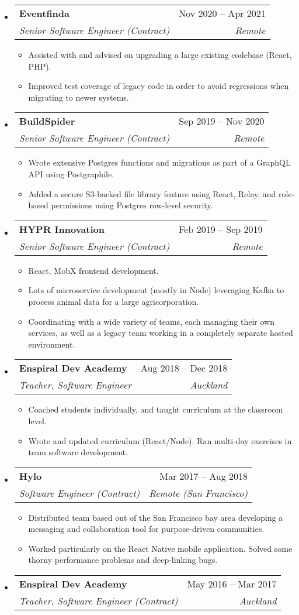 \documentclass[12pt]{article}
\makeatletter
\def \entryspacing {-0em}
\newcommand{\resumeEntryStart}{\begin{itemize}[leftmargin=2.5mm]}
\newcommand{\resumeEntryEnd}{\end{itemize}\vspace{\entryspacing}}
\newcommand{\resumeItemListStart}{\begin{itemize}[leftmargin=4.5mm]}
\newcommand{\resumeItemListEnd}{\end{itemize}}
\newcommand{\resumeItem}[1]{
  \item\small{
    {#1 \vspace{-0.9ex}}
  }
}
\newcommand{\resumeEntryTSDL}[4]{
  \vspace{-0.5ex}\item[]
    \begin{tabularx}{0.97\textwidth}{X@{\hspace{5em}}r}
      \textbf{\color{primary}#1} & {\firabook\color{accent}\small#2} \\
      \textit{\color{accent}\small#3} & \textit{\color{accent}\small#4} \\
    \end{tabularx}\vspace{-0.9ex}
}
\makeatother
\begin{document}
  \resumeEntryStart
    \resumeEntryTSDL
      {Eventfinda}{Nov 2020 -- Apr 2021}
      {Senior Software Engineer (Contract)}{Remote}
    \resumeItemListStart
        \resumeItem {Assisted with and advised on upgrading a large existing codebase (React, PHP).}
        \resumeItem {Improved test coverage of legacy code in order to avoid regressions when migrating to newer systems.}
    \resumeItemListEnd
  \resumeEntryEnd

  \resumeEntryStart
    \resumeEntryTSDL
      {BuildSpider}{Sep 2019 -- Nov 2020}
      {Senior Software Engineer (Contract)}{Remote}
    \resumeItemListStart
      \resumeItem {Wrote extensive Postgres functions and migrations as part of a GraphQL API using Postgraphile.}
      \resumeItem {Added a secure S3-backed file library feature using React, Relay, and role-based permissions using Postgres row-level security.}
    \resumeItemListEnd
  \resumeEntryEnd

  \resumeEntryStart
    \resumeEntryTSDL
      {HYPR Innovation}{Feb 2019 -- Sep 2019}
      {Senior Software Engineer (Contract)}{Remote}
    \resumeItemListStart
      \resumeItem {React, MobX frontend development.}
      \resumeItem {Lots of microservice development (mostly in Node) leveraging Kafka to process animal data for a large agricorporation.}
      \resumeItem {Coordinating with a wide variety of teams, each managing their own services, as well as a legacy team working in a completely separate hosted environment.}
    \resumeItemListEnd
  \resumeEntryEnd

  \resumeEntryStart
    \resumeEntryTSDL
      {Enspiral Dev Academy}{Aug 2018 -- Dec 2018}
      {Teacher, Software Engineer}{Auckland}
    \resumeItemListStart
      \resumeItem {Coached students individually, and taught curriculum at the classroom level.}
      \resumeItem {Wrote and updated curriculum (React/Node). Ran multi-day exercises in team software development.}
    \resumeItemListEnd
  \resumeEntryEnd

  \resumeEntryStart
    \resumeEntryTSDL
      {Hylo}{Mar 2017 -- Aug 2018}
      {Software Engineer (Contract)}{Remote (San Francisco)}
    \resumeItemListStart
      \resumeItem {Distributed team based out of the San Francisco bay area developing a messaging and collaboration tool for purpose-driven communities.}
      \resumeItem {Worked particularly on the React Native mobile application. Solved some thorny performance problems and deep-linking bugs.}
    \resumeItemListEnd
  \resumeEntryEnd

  \resumeEntryStart
    \resumeEntryTSDL
      {Enspiral Dev Academy}{May 2016 -- Mar 2017}
      {Teacher, Software Engineer (Contract)}{Auckland}
  \resumeEntryEnd
\end{document}

